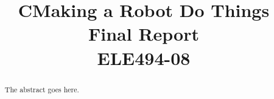 \documentclass[conference]{IEEEtran}
\begin{document}
\title{CMaking a  Robot Do Things\\[0.3cm]
\large Final Report\\
ELE494-08}

\author{
\and
{}
}

\maketitle

\begin{abstract}
    The abstract goes here.
\end{abstract}
\end{document}
